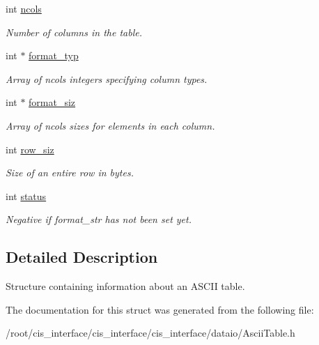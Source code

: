 \begin{DoxyCompactItemize}
int \mbox{\hyperlink{structasciiTable__t_a837095bd2a245987e98f2bdd1fccaa94}{ncols}}
\begin{DoxyCompactList}\small\item\em Number of columns in the table. \end{DoxyCompactList}\item 
\mbox{\label{structasciiTable__t_aaa59065a52a15e3dd33c6e043941ed8b}} 
int $\ast$ \mbox{\hyperlink{structasciiTable__t_aaa59065a52a15e3dd33c6e043941ed8b}{format\+\_\+typ}}
\begin{DoxyCompactList}\small\item\em Array of ncols integers specifying column types. \end{DoxyCompactList}\item 
\mbox{\label{structasciiTable__t_a807c3654eee6e0cedc1d8ce1d3e73b17}} 
int $\ast$ \mbox{\hyperlink{structasciiTable__t_a807c3654eee6e0cedc1d8ce1d3e73b17}{format\+\_\+siz}}
\begin{DoxyCompactList}\small\item\em Array of ncols sizes for elements in each column. \end{DoxyCompactList}\item 
\mbox{\label{structasciiTable__t_aaa2f0c09c59e6b4cdad4e3845552da35}} 
int \mbox{\hyperlink{structasciiTable__t_aaa2f0c09c59e6b4cdad4e3845552da35}{row\+\_\+siz}}
\begin{DoxyCompactList}\small\item\em Size of an entire row in bytes. \end{DoxyCompactList}\item 
\mbox{\label{structasciiTable__t_a3a1b4f901f6cad135a0600a22942c43b}} 
int \mbox{\hyperlink{structasciiTable__t_a3a1b4f901f6cad135a0600a22942c43b}{status}}
\begin{DoxyCompactList}\small\item\em Negative if format\+\_\+str has not been set yet. \end{DoxyCompactList}\end{DoxyCompactItemize}


\subsection{Detailed Description}
Structure containing information about an A\+S\+C\+II table. 

The documentation for this struct was generated from the following file\+:\begin{DoxyCompactItemize}
\item 
/root/cis\+\_\+interface/cis\+\_\+interface/cis\+\_\+interface/dataio/Ascii\+Table.\+h\end{DoxyCompactItemize}
